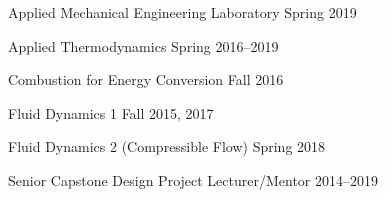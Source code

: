 \begin{outerlist}
\item Applied Mechanical Engineering Laboratory \hfill Spring 2019
\item Applied Thermodynamics \hfill Spring 2016--2019
\item Combustion for Energy Conversion \hfill Fall 2016

\item Fluid Dynamics 1 \hfill Fall 2015, 2017

\item Fluid Dynamics 2 (Compressible Flow) \hfill Spring 2018

\item Senior Capstone Design Project Lecturer/Mentor \hfill 2014--2019


\end{outerlist}
